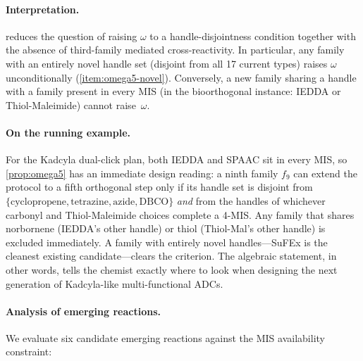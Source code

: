 \documentclass[preprint,12pt]{elsarticle}
\theoremstyle{definition}
\theoremstyle{remark}
\begin{document}
\paragraph{Interpretation.}
 reduces the question of raising
$\omega$ to a handle-disjointness condition together with the
absence of third-family mediated cross-reactivity.  In particular,
any family with an entirely novel handle set (disjoint from all
17 current types) raises $\omega$ unconditionally
(\cref{item:omega5-novel}).  Conversely, a new family sharing a
handle with a family present in every MIS (in the bioorthogonal
instance: IEDDA or Thiol-Maleimide) cannot raise~$\omega$.

\paragraph{On the running example.}
For the Kadcyla dual-click plan, both IEDDA and SPAAC sit in every
MIS, so \cref{prop:omega5} has an immediate design reading: a
ninth family $f_9$ can extend the protocol to a fifth orthogonal
step only if its handle set is disjoint from
$\{\text{cyclopropene}, \text{tetrazine}, \text{azide},
\text{DBCO}\}$ \emph{and} from the handles of whichever carbonyl
and Thiol-Maleimide choices complete a 4-MIS.  Any family that
shares norbornene (IEDDA's other handle) or thiol (Thiol-Mal's
other handle) is excluded immediately.  A family with entirely
novel handles---SuFEx is the cleanest existing candidate---clears
the criterion.  The algebraic statement, in other words, tells
the chemist exactly where to look when designing the next
generation of Kadcyla-like multi-functional ADCs.


\paragraph{Analysis of emerging reactions.}
We evaluate six candidate emerging reactions against the
MIS availability constraint:
\end{document}
